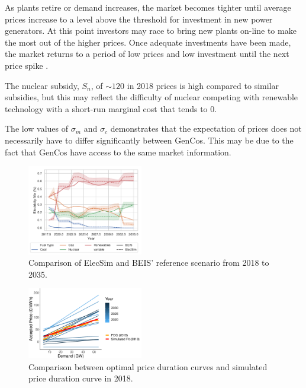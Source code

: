 As plants retire or demand increases, the market becomes tighter until average prices increase to a level above the threshold for investment in new power generators. At this point investors may race to bring new plants on-line to make the most out of the higher prices. Once adequate investments have been made, the market returns to a period of low prices and low investment until the next price spike \cite{Gross2007}. 


The nuclear subsidy, $S_n$, of ${\sim}$\textsterling $120$ in 2018 prices is high compared to similar subsidies, but this may reflect the difficulty of nuclear competing with renewable technology with a short-run marginal cost that tends to \textsterling $0$.

The low values of $\sigma_m$ and $\sigma_c$ demonstrates that the expectation of prices does not necessarily have to differ significantly between GenCos. This may be due to the fact that GenCos have access to the same market information.


\begin{figure}
	\centering
	\includegraphics[width=0.45\textwidth]{Chapter4/figures/e-Energy-2020/results/scenario_analysis/best_forward_scenario_below_legend.pdf}
	\caption{Comparison of ElecSim and BEIS' reference scenario from 2018 to 2035.}
	\label{fig:forward_scenario_beis_elecsim}
\end{figure}


\begin{figure}
	\centering
	\includegraphics[width=0.45\textwidth, height=0.45\textwidth, keepaspectratio]{Chapter4/figures/e-Energy-2020/results/scenario_analysis/optimal_pdc_prices.pdf}
	\caption{Comparison between optimal price duration curves and simulated price duration curve in 2018.}
	\label{fig:forward_scenario_best_pdcs}
\end{figure}


